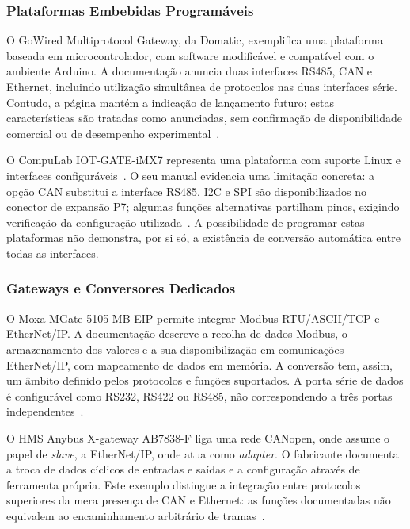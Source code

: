 \subsubsection{Plataformas Embebidas Programáveis}

O GoWired Multiprotocol Gateway, da Domatic, exemplifica uma plataforma
baseada em microcontrolador, com software modificável e compatível com
o ambiente Arduino. A documentação anuncia duas interfaces RS485, CAN
e Ethernet, incluindo utilização simultânea de protocolos nas duas
interfaces série. Contudo, a página mantém a indicação de lançamento
futuro; estas características são tratadas como anunciadas, sem
confirmação de disponibilidade comercial ou de desempenho
experimental~\cite{domatic_gowired}.

O CompuLab IOT-GATE-iMX7 representa uma plataforma com suporte Linux
e interfaces configuráveis~\cite{compulab_imx7}.
O seu manual evidencia uma limitação concreta: a opção CAN substitui
a interface RS485. I2C e SPI são disponibilizados no conector de
expansão P7; algumas funções alternativas partilham pinos, exigindo
verificação da configuração utilizada~\cite{compulab_imx7_manual_2018}.
A possibilidade de programar estas plataformas não demonstra, por si
só, a existência de conversão automática entre todas as interfaces.

\subsubsection{Gateways e Conversores Dedicados}

O Moxa MGate 5105-MB-EIP permite integrar Modbus RTU/ASCII/TCP e
EtherNet/IP. A documentação descreve a recolha de dados Modbus,
o armazenamento dos valores e a sua disponibilização em comunicações
EtherNet/IP, com mapeamento de dados em memória. A conversão tem,
assim, um âmbito definido pelos protocolos e funções suportados.
A porta série de dados é configurável como RS232, RS422 ou RS485,
não correspondendo a três portas independentes~\cite{moxa_mgate5105}.

O HMS Anybus X-gateway AB7838-F liga uma rede CANopen, onde assume
o papel de \textit{slave}, a EtherNet/IP, onde atua como
\textit{adapter}. O fabricante documenta a troca de dados cíclicos de
entradas e saídas e a configuração através de ferramenta própria.
Este exemplo distingue a integração entre protocolos superiores da
mera presença de CAN e Ethernet: as funções documentadas não
equivalem ao encaminhamento arbitrário de tramas~\cite{hms_ab7838}.

